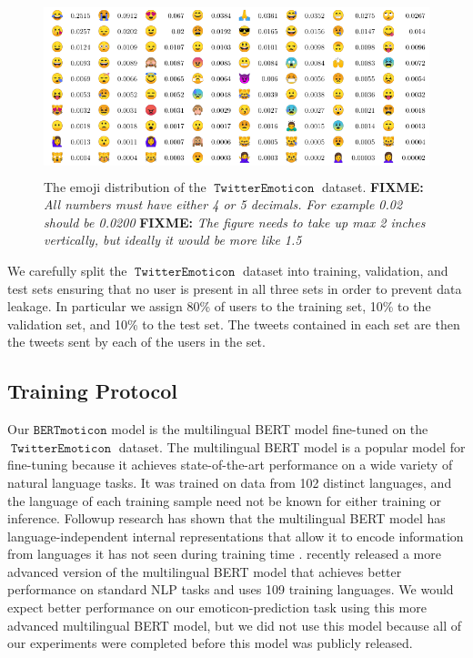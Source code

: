 \documentclass[11pt]{article}
\newcommand{\fixme}[1]{{\color{red} \textbf{FIXME:} {\textit {#1}}}}
\newcommand{\bertmoji}{\texttt{BERTmoticon}}
\DeclareMathOperator{\emoticon}{\texttt{TwitterEmoticon}}
\begin{document}
\begin{figure}
    \centering
    \includegraphics[height=2in]{images/emojitable.pdf}
    \caption{
        The emoji distribution of the $\emoticon$ dataset.
        \fixme{All numbers must have either 4 or 5 decimals.  For example 0.02 should be 0.0200}
        \fixme{The figure needs to take up max 2 inches vertically, but ideally it would be more like 1.5}
    } 
    \label{fig:stats:emoticon}
\end{figure}

We carefully split the $\emoticon$ dataset into training, validation, and test sets ensuring that no user is present in all three sets in order to prevent data leakage.
In particular we assign 80\% of users to the training set, 10\% to the validation set, and 10\% to the test set.
The tweets contained in each set are then the tweets sent by each of the users in the set.


\subsection{Training Protocol}

Our $\bertmoji$ model is the multilingual BERT model \citep{devlin2018bert} fine-tuned on the $\emoticon$ dataset.
The multilingual BERT model is a popular model for fine-tuning because it achieves state-of-the-art performance on a wide variety of natural language tasks.
It was trained on data from 102 distinct languages,
and the language of each training sample need not be known for either training or inference.
Followup research has shown that the multilingual BERT model has language-independent internal representations that allow it to encode information from languages it has not seen during training time \citep{pires2019multilingual,wu2019emerging}.
\citet{feng2020language} recently released a more advanced version of the multilingual BERT model that achieves better performance on standard NLP tasks and uses 109 training languages.
We would expect better performance on our emoticon-prediction task using this more advanced multilingual BERT model,
but we did not use this model because all of our experiments were completed before this model was publicly released.
\end{document}
